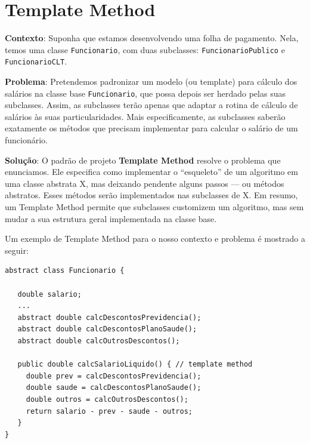\documentclass[
  11pt,
  twoside]{book}
\newcommand{\passthrough}[1]{#1}
\begin{document}
\hypertarget{template-method}{%
\section{Template Method}\label{template-method}}

 

\textbf{Contexto}: Suponha que estamos desenvolvendo uma folha de
pagamento. Nela, temos uma classe \passthrough{\lstinline!Funcionario!},
com duas subclasses: \passthrough{\lstinline!FuncionarioPublico!} e
\passthrough{\lstinline!FuncionarioCLT!}.

\textbf{Problema}: Pretendemos padronizar um modelo (ou template) para
cálculo dos salários na classe base
\passthrough{\lstinline!Funcionario!}, que possa depois ser herdado
pelas suas subclasses. Assim, as subclasses terão apenas que adaptar a
rotina de cálculo de salários às suas particularidades. Mais
especificamente, as subclasses saberão exatamente os métodos que
precisam implementar para calcular o salário de um funcionário.

\textbf{Solução}: O padrão de projeto \textbf{Template Method} resolve o
problema que enunciamos. Ele especifica como implementar o ``esqueleto''
de um algoritmo em uma classe abstrata X, mas deixando pendente alguns
passos --- ou métodos abstratos. Esses métodos serão implementados nas
subclasses de X. Em resumo, um Template Method permite que subclasses
customizem um algoritmo, mas sem mudar a sua estrutura geral
implementada na classe base.

Um exemplo de Template Method para o nosso contexto e problema é
mostrado a seguir:

\begin{lstlisting}
abstract class Funcionario {

   double salario;
   ...
   abstract double calcDescontosPrevidencia();
   abstract double calcDescontosPlanoSaude();
   abstract double calcOutrosDescontos();

   public double calcSalarioLiquido() { // template method
     double prev = calcDescontosPrevidencia();
     double saude = calcDescontosPlanoSaude();
     double outros = calcOutrosDescontos();
     return salario - prev - saude - outros;
   }
}
\end{lstlisting}
\end{document}
